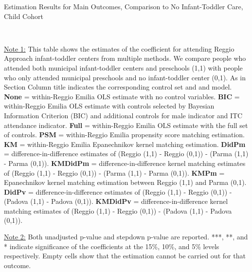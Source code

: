 \begin{table}[H] \caption{Estimation Results for Main Outcomes, Comparison to No Infant-Toddler Care, Child Cohort} \label{ols-M-child-reg-nopres-asilo}
\scalebox{0.6}{}
\vspace{1ex} \\
\footnotesize\raggedright{\underline{Note 1:} This table shows the estimates of the coefficient for attending Reggio Approach infant-toddler centers from multiple methods. We compare people who attended both municipal infant-toddler centers and preschools (1,1) with people who only attended municipal preschools and no infant-toddler center (0,1). As in Section Column title indicates the corresponding control set and and model.  \textbf{None} = within-Reggio Emilia OLS estimate with no control variables. \textbf{BIC} = within-Reggio Emilia OLS estimate with controls selected by Bayesian Information Criterion (BIC) and additional controls for male indicator and ITC attendance indicator. \textbf{Full} = within-Reggio Emilia OLS estimate with the full set of controls. \textbf{PSM} =  within-Reggio Emilia propensity score matching estimation. \textbf{KM} =  within-Reggio Emilia Epanechnikov kernel matching estimation. \textbf{DidPm} = difference-in-difference estimates of (Reggio (1,1) - Reggio (0,1)) - (Parma (1,1) - Parma (0,1)).  \textbf{KMDidPm} = difference-in-difference kernel matching estimates of (Reggio (1,1) - Reggio (0,1)) - (Parma (1,1) - Parma (0,1)).   \textbf{KMPm} =  Epanechnikov kernel matching estimation between Reggio (1,1) and Parma (0,1).   \textbf{DidPv} = difference-in-difference estimates of (Reggio (1,1) - Reggio (0,1)) - (Padova (1,1) - Padova (0,1)). \textbf{KMDidPv} = difference-in-difference kernel matching estimates of (Reggio (1,1) - Reggio (0,1)) - (Padova (1,1) - Padova (0,1)). }

\footnotesize\raggedright{\underline{Note 2:} Both unadjusted p-value and stepdown p-value are reported. ***, **, and * indicate significance of the coefficients at the 15\%, 10\%, and 5\% levels respectively. Empty cells show that the estimation cannot be carried out for that outcome.}
\end{table}

